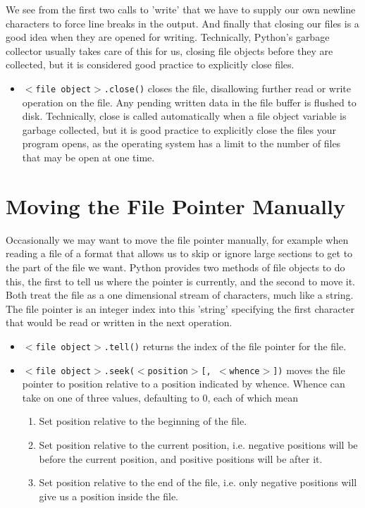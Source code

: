 \documentclass[a4paper,11pt]{article}
\begin{document}
We see from the first two calls to 'write' that we have to supply   our own newline characters to force line breaks in the output. And   finally that closing our files is a good idea when they are opened for   writing. Technically, Python's garbage collector usually takes care of   this for us, closing file objects before they are collected, but it is   considered good practice to explicitly close files.
\begin{itemize}
	\item 
\texttt{$<$file object$>$.close()} closes the file,    disallowing further read or write operation on the file. Any    pending written data in the file buffer is flushed to disk.    Technically, close is called automatically when a file object    variable is garbage collected, but it is good practice to    explicitly close the files your program opens, as the operating    system has a limit to the number of files that may be open at one    time.
\end{itemize}

\section{Moving the File Pointer Manually}

Occasionally we may want to move the file pointer manually, for   example when reading a file of a format that allows us to skip or   ignore large sections to get to the part of the file we want. Python   provides two methods of file objects to do this, the first to tell us   where the pointer is currently, and the second to move it. Both treat   the file as a one dimensional stream of characters, much like a string.   The file pointer is an integer index into this 'string' specifying the   first character that would be read or written in the next   operation.
\begin{itemize}
	\item 
\texttt{$<$file object$>$.tell()} returns the index of    the file pointer for the file.
	\item 
\texttt{$<$file object$>$.seek($<$position$>$[,     $<$whence$>$])} moves the file pointer to position     relative to a position indicated by whence. Whence can take on     one of three values, defaulting to 0, each of which mean      
\begin{enumerate}
	\item Set position relative to the beginning of the      file.
	\item Set position relative to the current position, i.e.      negative positions will be before the current position, and      positive positions will be after it.
	\item Set position relative to the end of the file, i.e. only      negative positions will give us a position inside the      file.
\end{enumerate}
\end{itemize}
\end{document}
